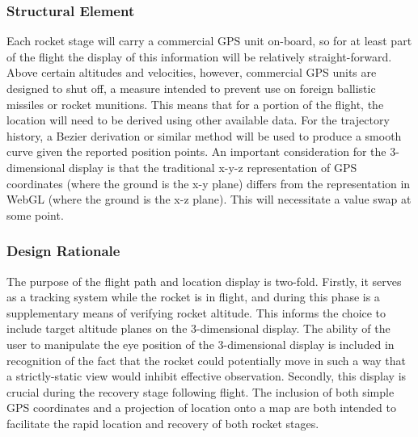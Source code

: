 \documentclass[journal,10pt,onecolumn,compsoc]{IEEEtran}
\begin{document}
		\subsubsection{Structural Element}
			Each rocket stage will carry a commercial GPS unit on-board, so for at least part of the flight the display of this information will be relatively straight-forward.
			Above certain altitudes and velocities, however, commercial GPS units are designed to shut off, a measure intended to prevent use on foreign ballistic missiles or rocket munitions.
			This means that for a portion of the flight, the location will need to be derived using other available data.
			For the trajectory history, a Bezier derivation or similar method will be used to produce a smooth curve given the reported position points.
			An important consideration for the 3-dimensional display is that the traditional x-y-z representation of GPS coordinates (where the ground is the x-y plane) differs from the representation in WebGL (where the ground is the x-z plane).
			This will necessitate a value swap at some point.

		\subsubsection{Design Rationale}
			The purpose of the flight path and location display is two-fold.
			Firstly, it serves as a tracking system while the rocket is in flight, and during this phase is a supplementary means of verifying rocket altitude.
			This informs the choice to include target altitude planes on the 3-dimensional display.
			The ability of the user to manipulate the eye position of the 3-dimensional display is included in recognition of the fact that the rocket could potentially move in such a way that a strictly-static view would inhibit effective observation.
			Secondly, this display is crucial during the recovery stage following flight.
			The inclusion of both simple GPS coordinates and a projection of location onto a map are both intended to facilitate the rapid location and recovery of both rocket stages.
\end{document}
